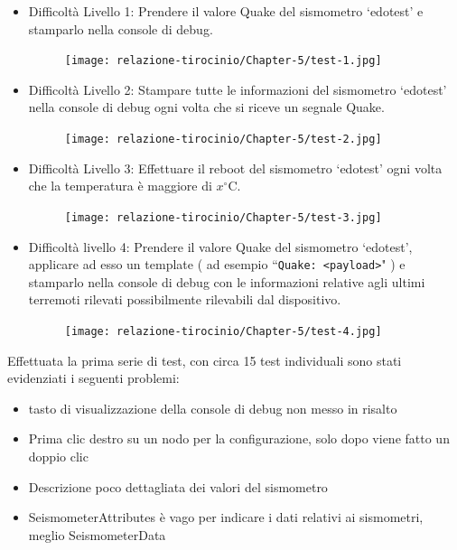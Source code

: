 \documentclass[a4paper,10pt]{memoir}
\begin{document}
\begin{itemize}
    \item Difficoltà Livello 1: Prendere il valore Quake del sismometro ‘edotest’ e stamparlo nella console di debug.
    
    \begin{figure}[ht]
        \centering
        \texttt{[image: relazione-tirocinio/Chapter-5/test-1.jpg]}
        \label{fig:test1}
    \end{figure}
    
    \item Difficoltà Livello 2: Stampare tutte le informazioni del sismometro ‘edotest’ nella console di debug ogni volta che si riceve un segnale Quake.
    
    \begin{figure}[ht]
        \centering
        \texttt{[image: relazione-tirocinio/Chapter-5/test-2.jpg]}
        \label{fig:test1}
    \end{figure}
    
    \item Difficoltà Livello 3: Effettuare il reboot del sismometro ‘edotest’ ogni volta che la temperatura è maggiore di $x^{\circ}$C.
    
    \begin{figure}[ht]
        \centering
        \texttt{[image: relazione-tirocinio/Chapter-5/test-3.jpg]}
        \label{fig:test1}
    \end{figure}
    
    \item Difficoltà livello 4: Prendere il valore Quake del sismometro ‘edotest’, applicare ad esso un template ( ad esempio ``\texttt{Quake: <payload>}" ) e stamparlo nella console di debug con le informazioni relative agli ultimi terremoti rilevati possibilmente rilevabili dal dispositivo.
    
    \begin{figure}[ht]
        \centering
        \texttt{[image: relazione-tirocinio/Chapter-5/test-4.jpg]}
        \label{fig:test1}
    \end{figure}
    
\end{itemize}

Effettuata la prima serie di test, con circa 15 test individuali sono stati evidenziati i seguenti problemi:

\begin{itemize}
    \item tasto di visualizzazione della console di debug non messo in risalto
    \item Prima clic destro su un nodo per la configurazione, solo dopo viene fatto un doppio clic
    \item Descrizione poco dettagliata dei valori del sismometro
    \item SeismometerAttributes è vago per indicare i dati relativi ai sismometri, meglio SeismometerData
\end{itemize}
\end{document}

